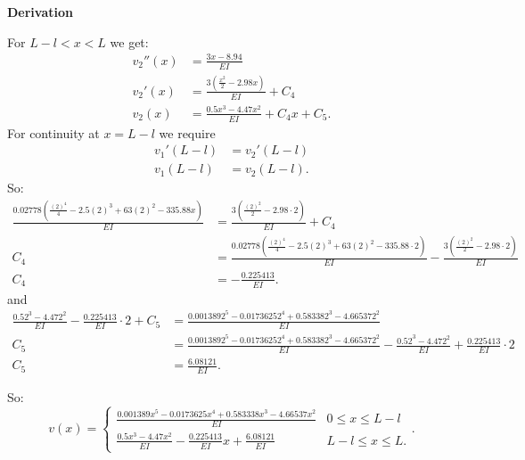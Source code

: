 \documentclass[a4paper]{article}
\numberwithin{equation}{problem}
\newcommand{\AUheading}[1]{%
  \par\vspace{.4\baselineskip}%
  {\sffamily\bfseries\color{AUblueDark}#1\par}%
  \nobreak%
}
\newenvironment{derivation}[1][Derivation]{%
  \AUheading{#1}
  \begingroup\allowdisplaybreaks
  \setlength{\abovedisplayskip}{6pt}%
  \setlength{\belowdisplayskip}{6pt}%
  \setlength{\abovedisplayshortskip}{4pt}%
  \setlength{\belowdisplayshortskip}{4pt}%
}{\par\endgroup\medskip}
\begin{document}
\begin{derivation}
\begin{itemize}
        For $L-l < x < L$ we get:
        \begin{align*}
          v_2''(x) &= \frac{3x - \num{8,94} }{EI} \\
          v_2'(x) &= \frac{3 \left(\frac{x^2}{2}- \num{2,98}  x\right)}{EI} + C_4 \\
          v_2(x) &= \frac{\num{0,5}  x^3-\num{4,47}  x^2}{EI} + C_4 x + C_5
        .\end{align*}
        For continuity at $x = L-l$ we require
        \begin{align*}
          v_1'(L-l) &= v_2'(L-l) \\
          v_1(L-l) &= v_2(L-l)
        .\end{align*}
        So:
        \begin{align*}
\frac{\num{0.02778} \left(\frac{(2)^4}{4}-\num{2,5} (2)^3+ 63 (2)^2-\num{335.88} x\right)}{EI} &= \frac{3 \left(\frac{(2)^2}{2}- \num{2,98}  \cdot 2\right)}{EI} + C_4 \\
C_4 &= \frac{\num{0.02778} \left(\frac{(2)^4}{4}-\num{2,5} (2)^3+ 63 (2)^2-\num{335.88} \cdot 2\right)}{EI}  -  \frac{3 \left(\frac{(2)^2}{2}- \num{2,98}  \cdot 2\right)}{EI}  \\
C_4 &= -\frac{\num{0.225413}}{EI}
        .\end{align*}
        and
        \begin{align*}
          \frac{\num{0,5}  2^3-\num{4,47}  2^2}{EI} - \frac{\num{0,225413}}{EI} \cdot 2  + C_5 &= \frac{\num{0.001389} 2^5-\num{0.0173625} 2^4+ \num{0.58338} 2^3- \num{4.66537} 2^2}{EI}  \\
          C_5 &=  \frac{\num{0.001389} 2^5-\num{0.0173625} 2^4+ \num{0.58338} 2^3- \num{4.66537} 2^2}{EI} - \frac{\num{0.52}^3 - \num{4.472}^2 }{EI} + \frac{\num{0.225413}}{EI} \cdot 2\\
           C_5   &= \frac{6.08121}{EI}
        .\end{align*}

        So:
        \begin{equation*}
          v(x) = \begin{cases}
            \frac{\num{0,001389} x^{5} - \num{0,0173625} x^{4} + \num{0.583338} x^3 - \num{4,66537} x^2}{EI} & 0 \leq x \leq L-l\\
            \frac{\num{0,5} x^3 - \num{4,47} x^2}{EI} - \frac{\num{0,225413}}{EI}x + \frac{\num{6,08121}}{EI} & L-l \leq x \leq L
          .\end{cases}
        .\end{equation*}


\end{itemize}
\end{derivation}
\end{document}
